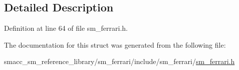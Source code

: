 \subsection{Detailed Description}


Definition at line 64 of file sm\+\_\+ferrari.\+h.



The documentation for this struct was generated from the following file\+:\begin{DoxyCompactItemize}
\item 
smacc\+\_\+sm\+\_\+reference\+\_\+library/sm\+\_\+ferrari/include/sm\+\_\+ferrari/\hyperlink{sm__ferrari_8h}{sm\+\_\+ferrari.\+h}\end{DoxyCompactItemize}
